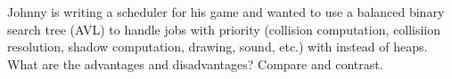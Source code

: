   Johnny is writing
  a scheduler for his game
  and wanted to use a balanced binary search tree (AVL)
  to handle jobs with priority
  (collision computation, collisiion resolution, shadow computation,
  drawing, sound, etc.) with
  instead of heaps.
  What are the advantages and disadvantages?
  Compare and contrast.
